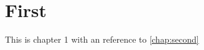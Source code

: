 \documentclass[../main]{subfiles}
\begin{document}
\chapter{First}
\label{chap:first}

This is chapter 1 with an reference to \autoref{chap:second}

\lipsum[1-5]
\end{document}
